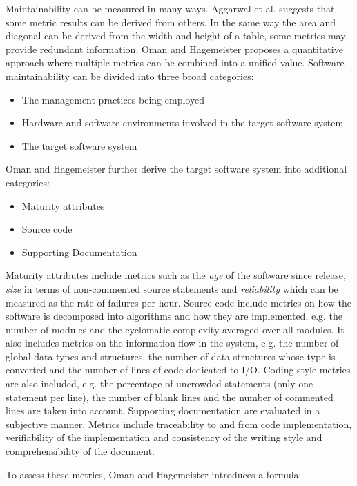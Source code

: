 Maintainability can be measured in many ways. Aggarwal et al.
\cite{aggarwal2006empirical} suggests that some metric results can be derived
from others. In the same way the area and diagonal can be derived from the
width and height of a table, some metrics may provide redundant information.
Oman and Hagemeister \cite{oman1992metrics} proposes a quantitative approach
where multiple metrics can be combined into a unified value. Software
maintainability can be divided into three broad categories:

\begin{itemize}
\item The management practices being employed
\item Hardware and software environments involved in the target software system
\item The target software system
\end{itemize}

Oman and Hagemeister further derive the target software system into additional
categories:

\begin{itemize}
\item Maturity attributes
\item Source code
\item Supporting Documentation
\end{itemize}

Maturity attributes include metrics such as the \textit{age} of the software
since release, \textit{size} in terms of non-commented source statements and
\textit{reliability} which can be measured as the rate of failures per hour.
Source code include metrics on how the software is decomposed into algorithms
and how they are implemented, e.g. the number of modules and the cyclomatic
complexity averaged over all modules. It also includes metrics on the
information flow in the system, e.g. the number of global data types and
structures, the number of data structures whose type is converted and the
number of lines of code dedicated to I/O. Coding style metrics are also
included, e.g. the percentage of uncrowded statements (only one statement per
line), the number of blank lines and the number of commented lines are taken
into account. Supporting documentation are evaluated in a subjective manner.
Metrics include traceability to and from code implementation, verifiability of
the implementation and consistency of the writing style and comprehensibility
of the document. \cite{oman1992metrics}

To assess these metrics, Oman and Hagemeister introduces a formula:

